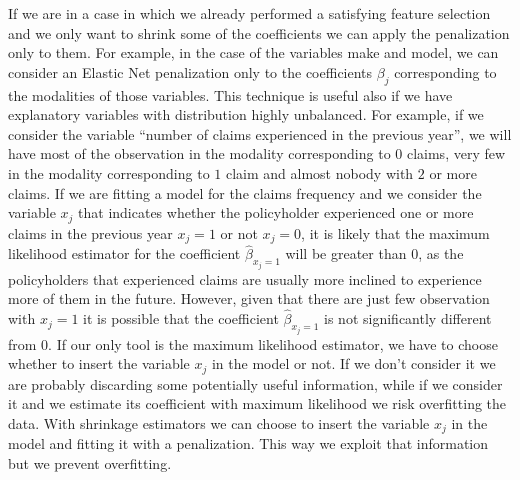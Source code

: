 \documentclass[a4paper, twoside, openright, 12pt]{report}
\theoremstyle{definition}
\theoremstyle{definition}
\theoremstyle{definition}
\theoremstyle{remark}
\begin{document}
If we are in a case in which we already performed a satisfying feature selection and we only want to shrink some of the coefficients we can apply the penalization only to them. For example, in the case of the variables make and model, we can consider an Elastic Net penalization only to the coefficients \(\beta_j\) corresponding to the modalities of those variables. This technique is useful also if we have explanatory variables with distribution highly unbalanced. For example, if we consider the variable ``number of claims experienced in the previous year'', we will have most of the observation in the modality corresponding to \(0\) claims, very few in the modality corresponding to \(1\) claim and almost nobody with \(2\) or more claims. If we are fitting a model for the claims frequency and we consider the variable \(x_j\) that indicates whether the policyholder experienced one or more claims in the previous year \(x_j=1\) or not \(x_j=0\), it is likely that the maximum likelihood estimator for the coefficient \(\hat{\beta}_{x_j=1}\) will be greater than \(0\), as the policyholders that experienced claims are usually more inclined to experience more of them in the future. However, given that there are just few observation with \(x_j=1\) it is possible that the coefficient \(\hat{\beta}_{x_j=1}\) is not significantly different from \(0\). If our only tool is the maximum likelihood estimator, we have to choose whether to insert the variable \(x_j\) in the model or not. If we don't consider it we are probably discarding some potentially useful information, while if we consider it and we estimate its coefficient with maximum likelihood we risk overfitting the data. With shrinkage estimators we can choose to insert the variable \(x_j\) in the model and fitting it with a penalization. This way we exploit that information but we prevent overfitting.
\end{document}
